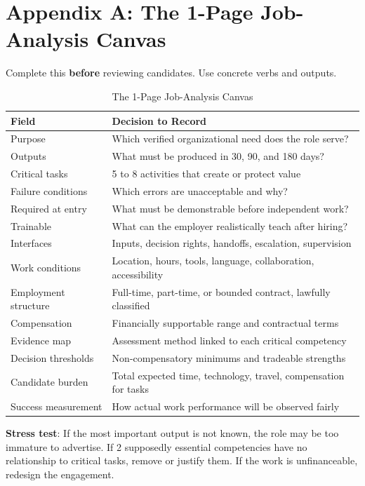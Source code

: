 \section*{Appendix A: The 1-Page Job-Analysis Canvas}

Complete this \textbf{before} reviewing candidates. Use concrete verbs and outputs.

\begin{table}[t]
\centering
\small
\caption{The 1-Page Job-Analysis Canvas}
\label{tab:job_analysis_canvas}
\begin{tabularx}{\textwidth}{p{4.2cm} X}
\toprule
\textbf{Field} & \textbf{Decision to Record} \\
\midrule
Purpose & Which verified organizational need does the role serve? \\
Outputs & What must be produced in 30, 90, and 180 days? \\
Critical tasks & 5 to 8 activities that create or protect value \\
Failure conditions & Which errors are unacceptable and why? \\
Required at entry & What must be demonstrable before independent work? \\
Trainable & What can the employer realistically teach after hiring? \\
Interfaces & Inputs, decision rights, handoffs, escalation, supervision \\
Work conditions & Location, hours, tools, language, collaboration, accessibility \\
Employment structure & Full-time, part-time, or bounded contract, lawfully classified \\
Compensation & Financially supportable range and contractual terms \\
Evidence map & Assessment method linked to each critical competency \\
Decision thresholds & Non-compensatory minimums and tradeable strengths \\
Candidate burden & Total expected time, technology, travel, compensation for tasks \\
Success measurement & How actual work performance will be observed fairly \\
\bottomrule
\end{tabularx}
\end{table}

\textbf{Stress test}: If the most important output is not known, the role may be too immature to advertise. If 2 supposedly essential competencies have no relationship to critical tasks, remove or justify them. If the work is unfinanceable, redesign the engagement.

